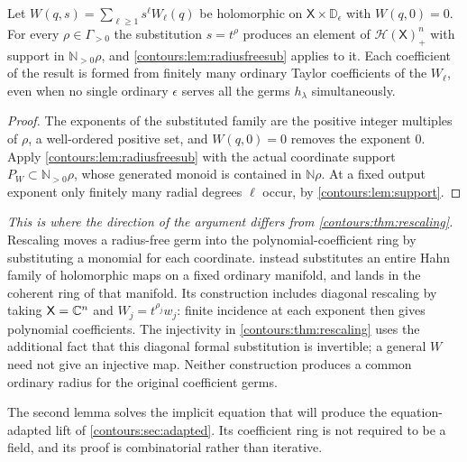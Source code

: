 \documentclass[11pt,letterpaper]{article}
\theoremstyle{definition}
\theoremstyle{remark}
\newcommand{\N}{\mathbb N}\newcommand{\Z}{\mathbb Z}\newcommand{\DD}{\mathbb D}
\newcommand{\HH}{\mathcal H}\newcommand{\A}{\mathscr A}\newcommand{\OO}{\mathcal O}
\numberwithin{equation}{section}
\begin{document}
\begin{corollary}
\label{contours:cor:radialeval}
Let $W(q,s)=\sum_{\ell\ge1}s^\ell W_\ell(q)$ be holomorphic on
$\mathsf X\times\DD_\epsilon$ with $W(q,0)=0$. For every $\rho\in\Gamma_{>0}$
the substitution $s=t^\rho$ produces an element of $\HH(\mathsf X)_+^n$ with
support in $\N_{>0}\rho$, and \cref{contours:lem:radiusfreesub} applies to it.
Each coefficient of the result is formed from finitely many ordinary Taylor
coefficients of the $W_\ell$, even when no single ordinary $\epsilon$ serves
all the germs $h_\lambda$ simultaneously.
\end{corollary}
\begin{proof}
The exponents of the substituted family are the positive integer multiples of
$\rho$, a well-ordered positive set, and $W(q,0)=0$ removes the exponent $0$.
Apply \cref{contours:lem:radiusfreesub} with the actual coordinate support
$P_W\subset\N_{>0}\rho$, whose generated monoid is contained in $\N\rho$.
At a fixed output exponent only finitely many radial degrees $\ell$ occur,
by \cref{contours:lem:support}.
\end{proof}

\emph{This is where the direction of the argument differs from
\cref{contours:thm:rescaling}.} Rescaling moves a radius-free germ into the
polynomial-coefficient ring by substituting a monomial for each coordinate.
 instead substitutes an entire Hahn family of
holomorphic maps on a fixed ordinary manifold, and lands in the coherent ring of
that manifold. Its construction includes diagonal rescaling by taking
$\mathsf X=\mathbb C^n$ and $W_j=t^{\rho_j}w_j$: finite incidence at each exponent
then gives polynomial coefficients. The injectivity in
\cref{contours:thm:rescaling} uses the additional fact that this diagonal
formal substitution is invertible; a general $W$ need not give an injective
map. Neither construction produces a common ordinary radius for the
original coefficient germs.

The second lemma solves the implicit equation that will produce the
equation-adapted lift of \cref{contours:sec:adapted}. Its coefficient ring is
not required to be a field, and its proof is combinatorial rather than
iterative.
\end{document}

